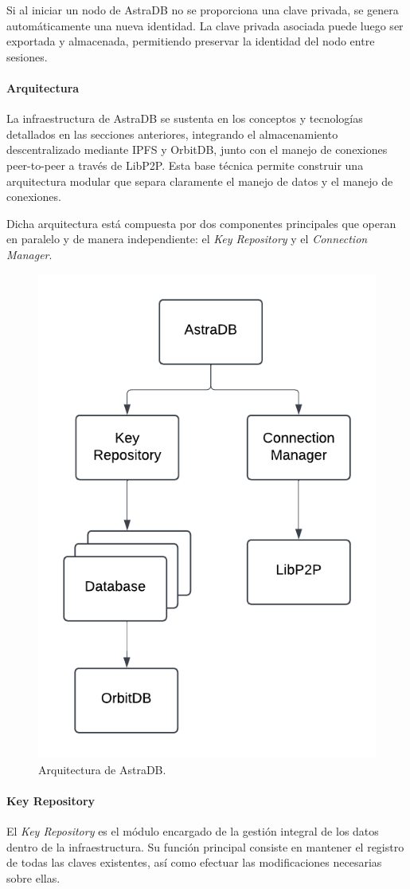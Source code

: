 Si al iniciar un nodo de AstraDB no se proporciona una clave privada, se genera automáticamente una nueva identidad. La clave privada asociada puede luego ser exportada y almacenada, permitiendo preservar la identidad del nodo entre sesiones.

\paragraph{Arquitectura}

La infraestructura de AstraDB se sustenta en los conceptos y tecnologías detallados en las secciones anteriores, integrando el almacenamiento descentralizado mediante IPFS y OrbitDB, junto con el manejo de conexiones peer-to-peer a través de LibP2P. Esta base técnica permite construir una arquitectura modular que separa claramente el manejo de datos y el manejo de conexiones.

Dicha arquitectura está compuesta por dos componentes principales que operan en paralelo y de manera independiente: el \textit{Key Repository} y el \textit{Connection Manager}.

\begin{figure}[H]
\centering
\includegraphics[width=0.5\linewidth]{img/solucion-ipfs/astradb-arquitectura.png}
\caption{Arquitectura de AstraDB.}
\label{fig:astradb-arquitectura}
\end{figure}

\paragraph{Key Repository}

El \textit{Key Repository} es el módulo encargado de la gestión integral de los datos dentro de la infraestructura. Su función principal consiste en mantener el registro de todas las claves existentes, así como efectuar las modificaciones necesarias sobre ellas.

